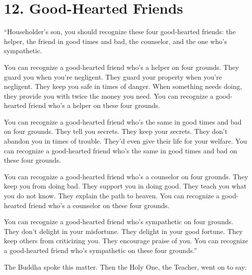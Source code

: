 \documentclass[12pt,openany]{book}%
\begin{document}
\section*{12. Good-Hearted Friends }

“Householder’s son, you should recognize these four good-hearted friends: the helper, the friend in good times and bad, the counselor, and the one who’s sympathetic. 

You can recognize a good-hearted friend who’s a helper on four grounds. They guard you when you’re negligent. They guard your property when you’re negligent. They keep you safe in times of danger. When something needs doing, they provide you with twice the money you need. You can recognize a good-hearted friend who’s a helper on these four grounds. 

You can recognize a good-hearted friend who’s the same in good times and bad on four grounds. They tell you secrets. They keep your secrets. They don’t abandon you in times of trouble. They’d even give their life for your welfare. You can recognize a good-hearted friend who’s the same in good times and bad on these four grounds. 

You can recognize a good-hearted friend who’s a counselor on four grounds. They keep you from doing bad. They support you in doing good. They teach you what you do not know. They explain the path to heaven. You can recognize a good-hearted friend who’s a counselor on these four grounds. 

You can recognize a good-hearted friend who’s sympathetic on four grounds. They don’t delight in your misfortune. They delight in your good fortune. They keep others from criticizing you. They encourage praise of you. You can recognize a good-hearted friend who’s sympathetic on these four grounds.” 

The Buddha spoke this matter. Then the Holy One, the Teacher, went on to say: 
\end{document}
